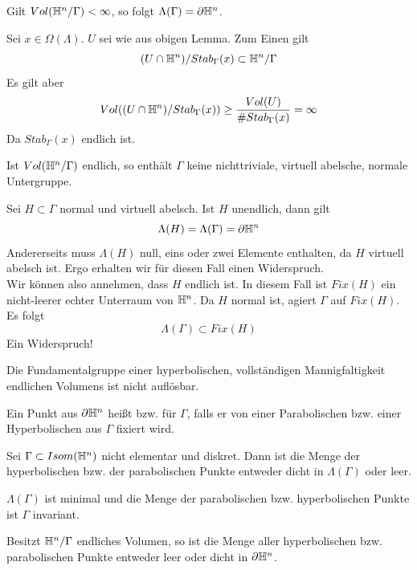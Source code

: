 \documentclass{book}
\begin{document}
\Prop{}
Gilt $Vol(\mathbb{H}^n / \Gamma) < \infty$, so folgt $\Lambda(\Gamma) = \partial\mathbb{H}^n$.
\begin{Beweis}{}
	Sei $x \in \Omega(\Lambda)$. $U$ sei wie aus obigen Lemma. Zum Einen gilt
	\[ (U\cap \mathbb{H}^n) / Stab_\Gamma(x) \subset \mathbb{H}^n / \Gamma \]
	Es gilt aber
	\[ Vol((U\cap \mathbb{H}^n) / Stab_\Gamma(x)) \geq  \frac{Vol(U)}{\# Stab_\Gamma(x)} = \infty \]
	Da $Stab_\Gamma(x)$ endlich ist.
\end{Beweis}

\Kor{}
Ist $Vol(\mathbb{H}^n / \Gamma)$ endlich, so enthält $\Gamma$ keine nichttriviale, virtuell abelsche, normale Untergruppe.
\begin{Beweis}{}
	Sei $H \subset \Gamma$ normal und virtuell abelsch. Ist $H$ unendlich, dann gilt
	\[ \Lambda(H) = \Lambda(\Gamma)= \partial \mathbb{H}^n \]
	Andererseits muss $\Lambda(H)$ null, eins oder zwei Elemente enthalten, da $H$ virtuell abelsch ist. Ergo erhalten wir für diesen Fall einen Widerspruch.\\
	Wir können also annehmen, dass $H$ endlich ist. In diesem Fall ist $Fix(H)$ ein nicht-leerer echter Unterraum von $\mathbb{H}^n$. Da $H$ normal ist, agiert $\Gamma$ auf $Fix(H)$. Es folgt
	\[ \Lambda(\Gamma) \subset Fix(H) \]
	Ein Widerspruch!
\end{Beweis}

\Kor{}
Die Fundamentalgruppe einer hyperbolischen, vollständigen Mannigfaltigkeit endlichen Volumens ist nicht auflösbar.

\Def{}
Ein Punkt aus $\partial \mathbb{H}^n$ heißt  bzw.  für $\Gamma$, falls er von einer Parabolischen bzw. einer Hyperbolischen aus $\Gamma$ fixiert wird.

\Prop{}
Sei $\Gamma \subset Isom(\mathbb{H}^n)$ nicht elementar und diskret. Dann ist die Menge der hyperbolischen bzw. der parabolischen Punkte entweder dicht in $\Lambda(\Gamma)$ oder leer.
\begin{Beweis}{}
	$\Lambda(\Gamma)$ ist minimal und die Menge der parabolischen bzw. hyperbolischen Punkte ist $\Gamma$ invariant.
\end{Beweis}

\Kor{}
Besitzt $\mathbb{H}^n / \Gamma$ endliches Volumen, so ist die Menge aller hyperbolischen bzw. parabolischen Punkte entweder leer oder dicht in $\partial \mathbb{H}^n$.
\end{document}
